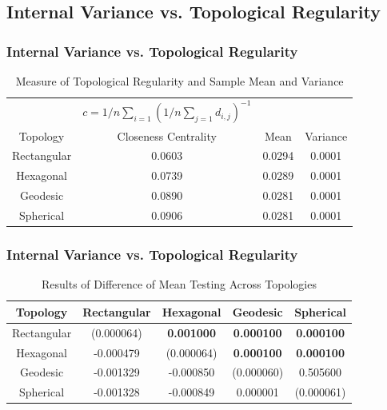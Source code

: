 \documentclass[nototal,handout]{beamer}
\begin{document}
\subsection{Internal Variance vs. Topological Regularity} 

\begin{frame}
	\frametitle{Internal Variance vs. Topological Regularity}
  \begin{table}
  \centering
  \begin{minipage}{\textwidth}
  \caption{Measure of Topological Regularity and Sample Mean and Variance}
  \label{vardeg}
  \begin{tabular}{|c||c|c|c|}
  \hline
  &$c=1/n \sum_{i=1} (1/n \sum_{j=1} d_{i,j})^{-1}$&&\\
  Topology & Closeness Centrality & Mean & Variance\\
  \hline
  Rectangular & 0.0603 & 0.0294 &0.0001\\
  Hexagonal & 0.0739 & 0.0289 &0.0001\\
  Geodesic & 0.0890 & 0.0281 &0.0001\\
  Spherical & 0.0906 & 0.0281 &0.0001\\
  \hline
  \end{tabular}
  \end{minipage}
  \end{table}
 \end{frame} 

\begin{frame}
	\frametitle{Internal Variance vs. Topological Regularity}
  \begin{table}
    \begin{minipage}{\textwidth}
    \caption{Results of Difference of Mean Testing Across Topologies}
    \label{rlt:all}
    \begin{tabular}{|c||c|c|c|c|}
    \hline
    \textbf{Topology}&Rectangular				&Hexagonal &Geodesic &Spherical\\\hline
    \hline
 		Rectangular & (0.000064) & \textbf{0.001000} & \textbf{0.000100} & \textbf{0.000100}\\\hline
 		Hexagonal & -0.000479 & (0.000064) & \textbf{0.000100} & \textbf{0.000100}\\\hline
 		Geodesic & -0.001329 & -0.000850 & (0.000060) & 0.505600\\\hline
 		Spherical & -0.001328 & -0.000849 & 0.000001 & (0.000061)\\\hline
 
    \end{tabular}
    \end{minipage}
  \end{table}
 \end{frame} 
\end{document}

